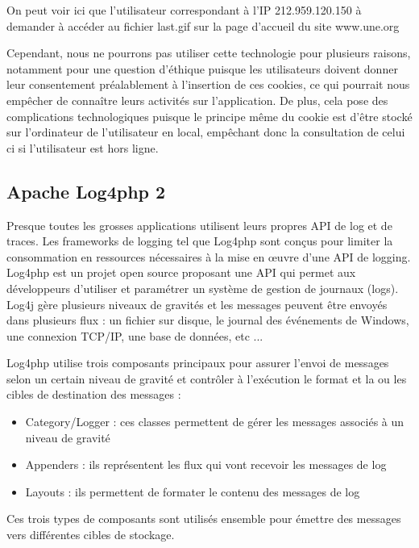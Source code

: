     On peut voir ici que l'utilisateur correspondant à l'IP 212.959.120.150 à demander à accéder au fichier last.gif sur la page d'accueil du site www.une.org
    
    Cependant, nous ne pourrons pas utiliser cette technologie pour plusieurs raisons, notamment pour une question d'éthique puisque les utilisateurs doivent donner leur consentement préalablement à l'insertion de ces cookies, ce qui pourrait nous empêcher de connaître leurs activités sur l'application. De plus, cela pose des complications technologiques puisque le principe même du cookie est d'être stocké sur l'ordinateur de l'utilisateur en local, empêchant donc la consultation de celui ci si l'utilisateur est hors ligne.
    
    \subsection{Apache Log4php 2}
    
    
    Presque toutes les grosses applications utilisent leurs propres API de log et de traces. Les frameworks de logging tel que Log4php sont conçus pour limiter la consommation en ressources nécessaires à la mise en œuvre d'une API de logging.
    Log4php est un projet open source proposant une API qui permet aux développeurs d'utiliser et paramétrer un système de gestion de journaux (logs). Log4j gère plusieurs niveaux de gravités et les messages peuvent être envoyés dans plusieurs flux : un fichier sur disque, le journal des événements de Windows, une connexion TCP/IP, une base de données, etc ...
   
   Log4php utilise trois composants principaux pour assurer l'envoi de messages selon un certain niveau de gravité et contrôler à l'exécution le format et la ou les cibles de destination des messages :

\begin{itemize}
	\item Category/Logger : ces classes permettent de gérer les messages associés à un niveau de gravité
    \item Appenders : ils représentent les flux qui vont recevoir les messages de log
    \item Layouts : ils permettent de formater le contenu des messages de log

\end{itemize}

	Ces trois types de composants sont utilisés ensemble pour émettre des messages vers différentes cibles de stockage.

